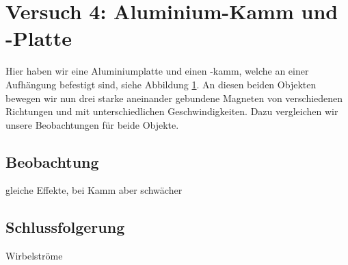 \documentclass[11pt,a4paper,titlepage, ngerman]{article}
\begin{document}
	\section{Versuch 4: Aluminium-Kamm und -Platte} 
	
		Hier haben wir eine Aluminiumplatte und einen -kamm, welche an einer Aufhängung befestigt sind, siehe Abbildung \ref{}. An diesen beiden Objekten bewegen wir nun drei starke aneinander gebundene Magneten von verschiedenen Richtungen und mit unterschiedlichen Geschwindigkeiten.
		Dazu vergleichen wir unsere Beobachtungen für beide Objekte.
		
		\subsection*{Beobachtung}
		
			gleiche Effekte, bei Kamm aber schwächer
			
		\subsection*{Schlussfolgerung}	
		
			Wirbelströme
		
\end{document}
